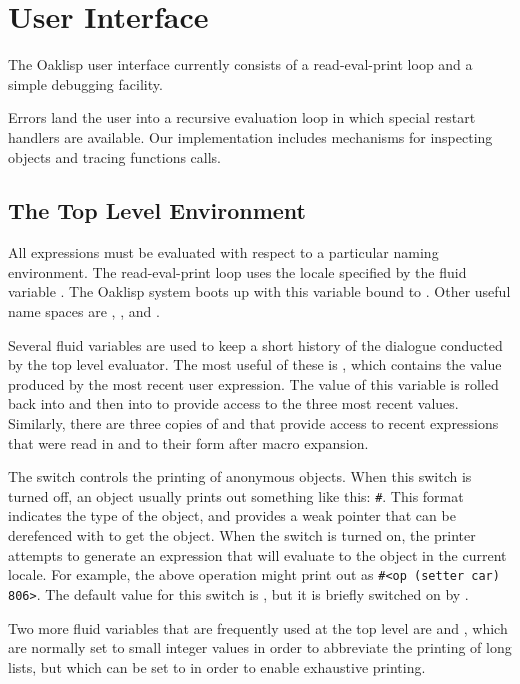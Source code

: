 \chapter{User Interface} \label{user}

The Oaklisp user interface currently consists of a read-eval-print
loop and a simple debugging facility.

Errors land the user into a recursive evaluation loop in which special
restart handlers are available.  Our implementation includes
mechanisms for inspecting objects and tracing functions calls.


\section{The Top Level Environment}

All expressions must be evaluated with respect to a particular naming
environment.  The read-eval-print loop uses the locale specified by
the fluid variable .  The Oaklisp system boots up
with this variable bound to .  Other useful name
spaces are , , and
.

Several fluid variables are used to keep a short history of the
dialogue conducted by the top level evaluator.  The most useful of
these is \dffl{*}, which contains the value produced by the most
recent user expression.  The value of this variable is rolled back
into \dffl{**} and then into \dffl{***} to provide access to the three
most recent values.  Similarly, there are three copies of \dffl{+} and
 that provide access to recent expressions that were read in
and to their form after macro expansion.

The switch  controls the printing of anonymous
objects.  When this switch is turned off, an object usually prints out
something like this: \texttt{\#<op 806>}.  This format indicates the type
of the object, and provides a weak pointer that can be derefenced with
 to get the object.  When the
 switch is turned on, the printer attempts to
generate an expression that will evaluate to the object in the current
locale.  For example, the above operation might print out as \texttt{\#<op
(setter car) 806>}.  The default value for this switch is
, but it is briefly switched on by .

Two more fluid variables that are frequently used at the top level are
 and , which are normally set to
small integer values in order to abbreviate the printing of long
lists, but which can be set to  in order to enable exhaustive
printing.

